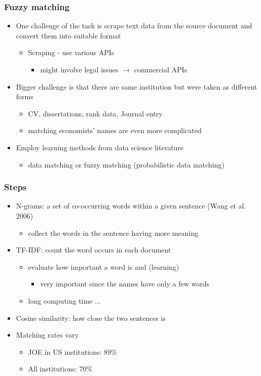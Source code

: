 \documentclass[11pt]{beamer}
\begin{document}
\begin{frame}[label=appendix]
	\frametitle{Fuzzy matching}
	\begin{itemize}
		\item One challenge of the task is scrape text data from the source document and convert them into suitable format
		\begin{itemize}
			\item Scraping - use various APIs 
			\begin{itemize}
				\item might involve legal issues $\rightarrow$ commercial APIs
			\end{itemize}
		\end{itemize} 
		\item Bigger challenge is that there are same institution but were taken as different forms 
		\begin{itemize}
			\item CV, dissertations, rank data, Journal entry
			\item matching economists' names are even more complicated
		\end{itemize}
			\item Employ learning methods from data science literature
			\begin{itemize}
				\item data matching or fuzzy matching (probabilistic data matching)
			\end{itemize}
	\end{itemize}
\end{frame}


\begin{frame}
	\frametitle{Steps}
	\begin{itemize}
	\item N-grams: a set of co-occurring words within a given sentence (Wang et al. 2006)
	\begin{itemize}
		\item collect the words in the sentence having more meaning
	\end{itemize}
	\item TF-IDF: count the word occurs in each document
	\begin{itemize}
		\item evaluate how important a word is and (learning)
		\begin{itemize}
			\item very important since the names have only a few words
		\end{itemize}
		\item long computing time ...
	\end{itemize}
	\item Cosine similarity: how close the two sentences is
	\item Matching rates vary
	\begin{itemize}
		\item JOE in US institutions: 89\%
		\item All institutions: 70\%
	\end{itemize}
	\end{itemize}
\hyperlink{Data}{}
\end{frame}
\end{document}
